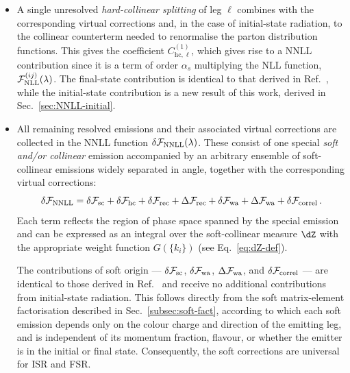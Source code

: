 \begin{itemize}
\item A single unresolved \emph{hard-collinear splitting} of leg
  $\ell$ combines with the corresponding virtual corrections and, in
  the case of initial-state radiation, to the collinear counterterm
  needed to renormalise the parton distribution functions. This gives
  the coefficient $C_{\mathrm{hc},\ell}^{(1)}$, which gives rise to a NNLL
  contribution since it is a term of order $\alpha_s$
  multiplying the NLL function, $\mathcal{F}^{(ij)}_{\rm NLL}(\lambda)$.
The final-state contribution is identical to that derived in Ref.~\cite{Arpino:2019ozn}, 
while the initial-state contribution is a new result of this work, derived
 in Sec.~\ref{sec:NNLL-initial}.  
  
  \item All remaining resolved emissions and their associated virtual
  corrections are collected in the NNLL function
  $\delta\mathcal{F}_{\rm NNLL}(\lambda)$. These consist of one
  special \emph{soft and/or collinear} emission accompanied by an
  arbitrary ensemble of soft-collinear emissions widely
  separated in angle, together with the corresponding virtual
  corrections:
   \begin{equation}
    \label{eq:dFNNLL}
    \delta\mathcal{F}_{\rm NNLL} =
    \delta\mathcal{F}_{\rm sc}
    +\delta\mathcal{F}_{\rm hc}
    +\delta\mathcal{F}_{\rm rec}
    +\Delta\mathcal{F}_{\rm rec}
    +\delta\mathcal{F}_{\rm wa}
    +\Delta\mathcal{F}_{\rm wa}
    +\delta\mathcal{F}_{\rm correl}\,.
  \end{equation}
  Each term reflects the region of phase space spanned by the special emission
  and can be expressed as an integral over the soft-collinear measure $\dZ$ with the appropriate weight function $G(\{k_i\})$ 
  (see Eq.~\eqref{eq:dZ-def}). 

The contributions of soft origin ---
$\delta\mathcal{F}_{\rm sc}$, $\delta\mathcal{F}_{\rm wa}$,
$\Delta\mathcal{F}_{\rm wa}$, and $\delta\mathcal{F}_{\rm correl}$
--- are identical to those derived in Ref.~\cite{Arpino:2019ozn} and
receive no additional contributions from initial-state radiation. This follows directly
from the soft matrix-element factorisation described in
Sec.~\ref{subsec:soft-fact}, according to which each soft emission
depends only on the colour charge and direction of the emitting leg,
and is independent of its momentum fraction, flavour, or whether the
emitter is in the initial or final state. Consequently, the soft
corrections are universal for ISR and FSR.


\end{itemize}
